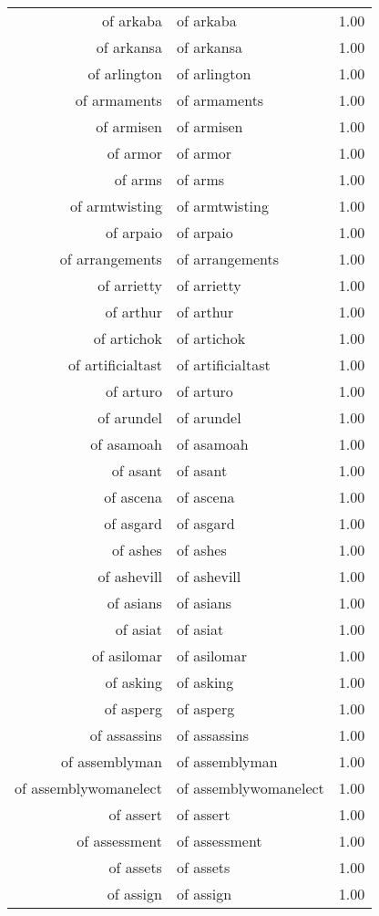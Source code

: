 \begin{table}[ht]
\begin{tabular}{rlr}
  of arkaba & of arkaba & 1.00 \\ 
  of arkansa & of arkansa & 1.00 \\ 
  of arlington & of arlington & 1.00 \\ 
  of armaments & of armaments & 1.00 \\ 
  of armisen & of armisen & 1.00 \\ 
  of armor & of armor & 1.00 \\ 
  of arms & of arms & 1.00 \\ 
  of armtwisting & of armtwisting & 1.00 \\ 
  of arpaio & of arpaio & 1.00 \\ 
  of arrangements & of arrangements & 1.00 \\ 
  of arrietty & of arrietty & 1.00 \\ 
  of arthur & of arthur & 1.00 \\ 
  of artichok & of artichok & 1.00 \\ 
  of artificialtast & of artificialtast & 1.00 \\ 
  of arturo & of arturo & 1.00 \\ 
  of arundel & of arundel & 1.00 \\ 
  of asamoah & of asamoah & 1.00 \\ 
  of asant & of asant & 1.00 \\ 
  of ascena & of ascena & 1.00 \\ 
  of asgard & of asgard & 1.00 \\ 
  of ashes & of ashes & 1.00 \\ 
  of ashevill & of ashevill & 1.00 \\ 
  of asians & of asians & 1.00 \\ 
  of asiat & of asiat & 1.00 \\ 
  of asilomar & of asilomar & 1.00 \\ 
  of asking & of asking & 1.00 \\ 
  of asperg & of asperg & 1.00 \\ 
  of assassins & of assassins & 1.00 \\ 
  of assemblyman & of assemblyman & 1.00 \\ 
  of assemblywomanelect & of assemblywomanelect & 1.00 \\ 
  of assert & of assert & 1.00 \\ 
  of assessment & of assessment & 1.00 \\ 
  of assets & of assets & 1.00 \\ 
  of assign & of assign & 1.00 \\ 

\end{tabular}
\end{table}
